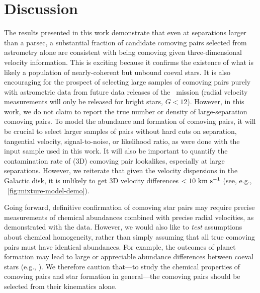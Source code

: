\documentclass[modern, letterpaper]{aastex61}
\newcommand{\gaia}{\project{Gaia}}
\begin{document}
\section{Discussion} \label{sec:discussion}


The results presented in this work demonstrate that even at separations larger
than a parsec, a substantial fraction of candidate comoving pairs selected from
astrometry alone are consistent with being comoving given three-dimensional
velocity information.
This is exciting because it confirms the existence of what is likely a
population of nearly-coherent but unbound coeval stars.
It is also encouraging for the prospect of selecting large samples of comoving
pairs purely with astrometric data from future data releases of the \gaia\
mission (radial velocity measurements will only be released for bright stars, $G
< 12$).
However, in this work, we do not claim to report the true number or density of
large-separation comoving pairs.
To model the abundance and formation of comoving pairs, it will be crucial to
select larger samples of pairs without hard cuts on separation, tangential
velocity, signal-to-noise, or likelihood ratio, as were done with the input
sample used in this work.
It will also be important to quantify the contamination rate of (3D) comoving
pair lookalikes, especially at large separations.
However, we reiterate that given the velocity dispersions in the Galactic disk,
it is unlikely to get 3D velocity differences $<10~\mathrm{km}~\mathrm{s}^{-1}$ (see, e.g.,
\figurename~\ref{fig:mixture-model-demo}).

Going forward, definitive confirmation of comoving star pairs may require
precise measurements of chemical abundances combined with precise radial
velocities, as demonstrated with the \acronym{LAMOST} data.
However, we would also like to \emph{test} assumptions about chemical
homogeneity, rather than simply assuming that all true comoving pairs must have
identical abundances.
For example, the outcomes of planet formation may lead to large or appreciable
abundance differences between coeval stars (e.g.,
\citealt{Pinsonneault:2001,Oh:2017a}).
We therefore caution that---to study the chemical properties of comoving pairs
and star formation in general---the comoving pairs should be selected from their
kinematics alone.
\end{document}
